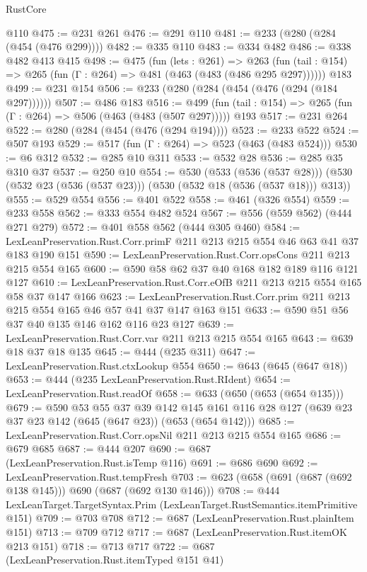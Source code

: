 \begin{lexlean}{RustCore}
\begin{coremodule}
    @110
@475 := @231 @261
@476 := @291 @110
@481 := @233 (@280 (@284 (@454 (@476 @299))))
@482 := @335 @110
@483 := @334 @482
@486 := @338 @482 @413 @415
@498 := @475
    (fun (lets : @261) =>
    @263 (fun (tail : @154) => @265 (fun (Γ : @264) => @481 (@463 (@483 (@486 @295 @297))))))
    @183
@499 := @231 @154
@506 := @233 (@280 (@284 (@454 (@476 (@294 (@184 @297))))))
@507 := @486 @183
@516 := @499 (fun (tail : @154) => @265 (fun (Γ : @264) => @506 (@463 (@483 (@507 @297))))) @193
@517 := @231 @264
@522 := @280 (@284 (@454 (@476 (@294 @194))))
@523 := @233 @522
@524 := @507 @193
@529 := @517 (fun (Γ : @264) => @523 (@463 (@483 @524)))
@530 := @6 @312
@532 := @285 @10 @311
@533 := @532 @28
@536 := @285 @35 @310 @37
@537 := @250 @10
@554 := @530
    (@533 (@536 (@537 @28)))
    (@530 (@532 @23 (@536 (@537 @23))) (@530 (@532 @18 (@536 (@537 @18))) @313))
@555 := @529 @554
@556 := @401 @522
@558 := @461 (@326 @554)
@559 := @233 @558
@562 := @333 @554 @482 @524
@567 := @556 (@559 @562) (@444 @271 @279)
@572 := @401 @558 @562 (@444 @305 @460)
@584 := LexLeanPreservation.Rust.Corr.primF @211 @213 @215 @554 @46 @63 @41 @37 @183 @190 @151
@590 := LexLeanPreservation.Rust.Corr.opsCons @211 @213 @215 @554 @165
@600 := @590 @58 @62 @37 @40 @168 @182 @189 @116 @121 @127
@610 := LexLeanPreservation.Rust.Corr.eOfB @211 @213 @215 @554 @165 @58 @37 @147 @166
@623 := LexLeanPreservation.Rust.Corr.prim @211 @213 @215 @554 @165 @46 @57 @41 @37 @147 @163 @151
@633 := @590 @51 @56 @37 @40 @135 @146 @162 @116 @23 @127
@639 := LexLeanPreservation.Rust.Corr.var @211 @213 @215 @554 @165
@643 := @639 @18 @37 @18 @135
@645 := @444 (@235 @311)
@647 := LexLeanPreservation.Rust.ctxLookup @554
@650 := @643 (@645 (@647 @18))
@653 := @444 (@235 LexLeanPreservation.Rust.RIdent)
@654 := LexLeanPreservation.Rust.readOf
@658 := @633 (@650 (@653 (@654 @135)))
@679 := @590
    @53
    @55
    @37
    @39
    @142
    @145
    @161
    @116
    @28
    @127
    (@639 @23 @37 @23 @142 (@645 (@647 @23)) (@653 (@654 @142)))
@685 := LexLeanPreservation.Rust.Corr.opsNil @211 @213 @215 @554 @165
@686 := @679 @685
@687 := @444 @207
@690 := @687 (LexLeanPreservation.Rust.isTemp @116)
@691 := @686 @690
@692 := LexLeanPreservation.Rust.tempFresh
@703 := @623 (@658 (@691 (@687 (@692 @138 @145))) @690 (@687 (@692 @130 @146)))
@708 := @444 LexLeanTarget.TargetSyntax.Prim (LexLeanTarget.RustSemantics.itemPrimitive @151)
@709 := @703 @708
@712 := @687 (LexLeanPreservation.Rust.plainItem @151)
@713 := @709 @712
@717 := @687 (LexLeanPreservation.Rust.itemOK @213 @151)
@718 := @713 @717
@722 := @687 (LexLeanPreservation.Rust.itemTyped @151 @41)

\end{coremodule}
\end{lexlean}
